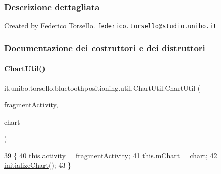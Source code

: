 \subsubsection{Descrizione dettagliata}
Created by Federico Torsello. \href{mailto:federico.torsello@studio.unibo.it}{\tt federico.\+torsello@studio.\+unibo.\+it} 

\subsubsection{Documentazione dei costruttori e dei distruttori}
\hypertarget{classit_1_1unibo_1_1torsello_1_1bluetoothpositioning_1_1util_1_1ChartUtil_a970bbc9180f662f25db53309407d562d_a970bbc9180f662f25db53309407d562d}{}\label{classit_1_1unibo_1_1torsello_1_1bluetoothpositioning_1_1util_1_1ChartUtil_a970bbc9180f662f25db53309407d562d_a970bbc9180f662f25db53309407d562d} 
\paragraph{\texorpdfstring{Chart\+Util()}{ChartUtil()}}
{\footnotesize\ttfamily it.\+unibo.\+torsello.\+bluetoothpositioning.\+util.\+Chart\+Util.\+Chart\+Util (\begin{DoxyParamCaption}\item[{Fragment\+Activity}]{fragment\+Activity,  }\item[{Line\+Chart}]{chart }\end{DoxyParamCaption})}


\begin{DoxyCode}
39                                                                          \{
40         this.\hyperlink{classit_1_1unibo_1_1torsello_1_1bluetoothpositioning_1_1util_1_1ChartUtil_acf9c1988f7aaacc3f3354ac7e9eeef6a_acf9c1988f7aaacc3f3354ac7e9eeef6a}{activity} = fragmentActivity;
41         this.\hyperlink{classit_1_1unibo_1_1torsello_1_1bluetoothpositioning_1_1util_1_1ChartUtil_a60b5bd6796cc5dcde12d9a6bb3e67c86_a60b5bd6796cc5dcde12d9a6bb3e67c86}{mChart} = chart;
42         \hyperlink{classit_1_1unibo_1_1torsello_1_1bluetoothpositioning_1_1util_1_1ChartUtil_aab1a6bd41cbf8228c53d633af6b89bb7_aab1a6bd41cbf8228c53d633af6b89bb7}{initializeChart}();
43     \}
\end{DoxyCode}


